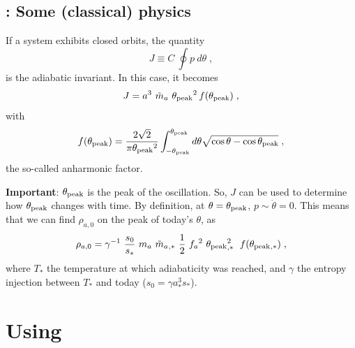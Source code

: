 \documentclass[10pt,utf8,compress,xcolor=dvipsnames]{beamer}
\begin{document}
\subsection{\mimes: Some (classical) physics}
\begin{frame}{\insertsubsectionhead}
	If a system exhibits closed orbits, the quantity
	\begin{equation*}
		J \equiv C \ \oint p \ d \theta \;,
	\end{equation*}
	is the adiabatic invariant. In this case, it becomes
	\begin{equation*}
		J = a^3 \ \tilde m_{a}{} \ \theta_{\rm peak}{}^2  \, f(\theta_{\rm peak}{})  \;,
	\end{equation*}
	with 
	\begin{equation*}
		f(\theta_{\rm peak}{}) =\dfrac{ 2 \sqrt{2}}{\pi \theta_{\rm peak}{}^2 } \displaystyle \int_{- \theta_{\rm peak}{}}^{\theta_{\rm peak}{}} d \theta \sqrt{ \cos \theta - \cos \theta_{\rm peak}{} } \;,
	\end{equation*}
	 the so-called anharmonic factor.\pause
		 
	\textbf{Important}: $\theta_{\rm peak}{}$ is the peak of the oscillation. So, $J$ can be used to determine how $\theta_{\rm peak}{}$ changes with time. By definition, at $\theta=\theta_{\rm peak}{}$, $p \sim \dot \theta = 0$.
	This means that we can find $\rho_{a,0}$ on the peak of today's $\theta$, as
	\begin{equation*}
		\rho_{a,0} = \gamma^{-1} \ \dfrac{s_0}{s_*} \ \ma \ \maT_{,*} \ \dfrac{1}{2} \ \fa^2 \ \thetamax_{,*}^2 \;  \ f(\thetamax_{,*}) \;,
	\end{equation*}
	where $T_{*}$ the temperature at which adiabaticity was reached, and $\gamma$ the entropy injection between $T_*$ and today (\ie $s_0 = \gamma a_*^3 s_*$). 	  
\end{frame}

\section{Using \mimes}
\end{document}
